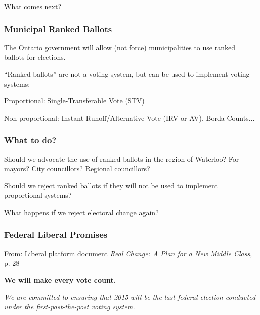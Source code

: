 \documentclass[14pt,t,hyperref={colorlinks=true,urlcolor=red}]{beamer}
\newcommand{\spooky}[1]{{\Huge \fontfamily{lgfz}\fontseries{m}\fontshape{n} \selectfont #1}}
\newcommand{\bigspookytext}[1]
{
\vspace{\stretch{1}}
\begin{center}
\spooky{#1}
\end{center}
\vspace{\stretch{1}}
}
\begin{document}
\begin{frame}

\bigspookytext{What comes next?}

\end{frame}


\begin{frame}
\frametitle{Municipal Ranked Ballots}

The Ontario government will allow (not force) municipalities to use ranked ballots for elections.

``Ranked ballots'' are not a voting system, but can be used to
implement voting systems: 

\begin{itemize*}

\item Proportional: Single-Transferable Vote (STV)

\item Non-proportional: Instant Runoff/Alternative Vote 
(IRV or AV), Borda Counts... 

\end{itemize*}
\end{frame}

\begin{frame}
\frametitle{What to do?}

Should we advocate the use of ranked ballots in the region of
Waterloo? For mayors? City councillors? Regional councillors? 

Should we reject ranked ballots if they will not be used to 
implement proportional systems?

What happens if we reject electoral change again?

\end{frame}


\begin{frame}
\frametitle{Federal Liberal Promises}


From: Liberal platform document \textit{Real Change: A Plan for a New Middle Class}, p. 28


\textbf{We will make every vote count.}

\textit{
We are committed to ensuring that 2015 will be the last federal
election conducted under the first-past-the-post voting system.
}

\end{frame}
\end{document}
